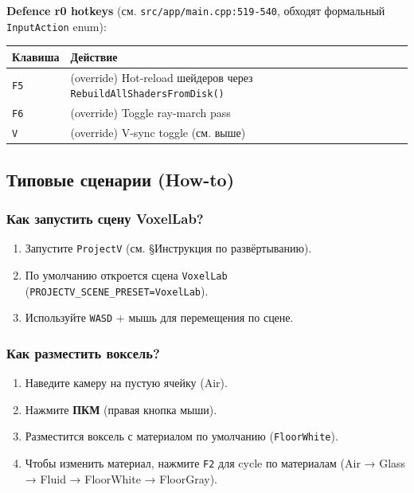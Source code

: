 \textbf{Defence r0 hotkeys} (см. \texttt{src/app/main.cpp:519-540}, обходят формальный \texttt{InputAction} enum):

\begin{longtable}[]{@{}ll@{}}
\toprule\noalign{}
Клавиша & Действие \\
\midrule\noalign{}
\endhead
\bottomrule\noalign{}
\endlastfoot
\texttt{F5} & (override) Hot-reload шейдеров через \texttt{RebuildAllShadersFromDisk()} \\
\texttt{F6} & (override) Toggle ray-march pass \\
\texttt{V} & (override) V-sync toggle (см. выше) \\
\end{longtable}

\subsection{Типовые сценарии (How-to)}\label{KT-3.1_User_Guide-ux442ux438ux43fux43eux432ux44bux435-ux441ux446ux435ux43dux430ux440ux438ux438-how-to}

\subsubsection{Как запустить сцену VoxelLab?}\label{KT-3.1_User_Guide-ux43aux430ux43a-ux437ux430ux43fux443ux441ux442ux438ux442ux44c-ux441ux446ux435ux43dux443-voxellab}

\begin{enumerate}
\def\labelenumi{\arabic{enumi}.}
\tightlist
\item
  Запустите \texttt{ProjectV} (см. §Инструкция по развёртыванию).
\item
  По умолчанию откроется сцена \texttt{VoxelLab} (\texttt{PROJECTV\_SCENE\_PRESET=VoxelLab}).
\item
  Используйте \texttt{WASD} + мышь для перемещения по сцене.
\end{enumerate}

\subsubsection{Как разместить воксель?}\label{KT-3.1_User_Guide-ux43aux430ux43a-ux440ux430ux437ux43cux435ux441ux442ux438ux442ux44c-ux432ux43eux43aux441ux435ux43bux44c}

\begin{enumerate}
\def\labelenumi{\arabic{enumi}.}
\tightlist
\item
  Наведите камеру на пустую ячейку (Air).
\item
  Нажмите \textbf{ПКМ} (правая кнопка мыши).
\item
  Разместится воксель с материалом по умолчанию (\texttt{FloorWhite}).
\item
  Чтобы изменить материал, нажмите \texttt{F2} для cycle по материалам (Air → Glass → Fluid → FloorWhite → FloorGray).
\end{enumerate}

